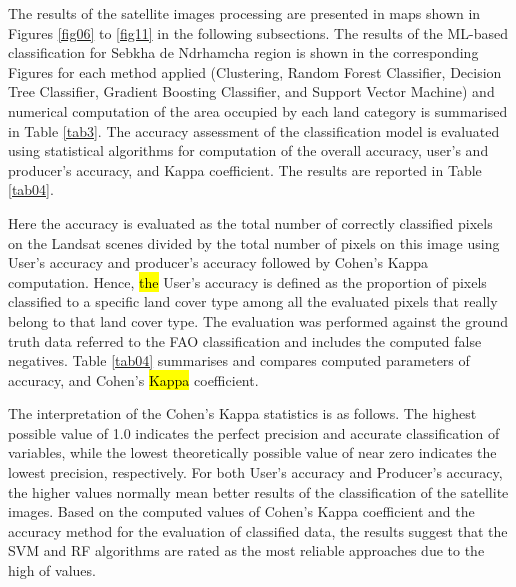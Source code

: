 \documentclass[12pt,a4paper,oneside]{article}
\def \newpar{\vspace{6pt}}
\begin{document}
\newpar The results of the satellite images processing are presented in maps shown in Figures \ref{fig06} to \ref{fig11} in the following subsections. The results of the ML-based classification for Sebkha de Ndrhamcha region  is shown in the corresponding Figures for each method applied (Clustering, Random Forest Classifier, Decision Tree Classifier, Gradient Boosting Classifier, and Support Vector Machine) and numerical computation of the area occupied by each land category is summarised in Table \ref{tab3}. The accuracy assessment of the classification model is evaluated using statistical algorithms for computation of the overall accuracy, user's and producer's accuracy, and Kappa coefficient. The results are reported in Table \ref{tab04}.

\newpar Here the accuracy is evaluated as the total number of correctly classified pixels on the Landsat scenes divided by the total number of pixels on this image using User's accuracy and producer's accuracy followed by Cohen's Kappa computation. Hence, \hl{the} User's accuracy is defined as the proportion of pixels classified to a specific land cover type among all the evaluated pixels that really belong to that land cover type. The evaluation was performed against the ground truth data referred to the FAO classification and includes the computed false negatives. Table \ref{tab04} summarises and compares computed parameters of accuracy, and Cohen's \hl{Kappa} coefficient.

\newpar The interpretation of the Cohen's Kappa statistics is as follows. The highest possible value of 1.0 indicates the perfect precision and accurate classification of variables, while the lowest theoretically possible value of near zero indicates the lowest precision, respectively. For both User's accuracy and Producer's accuracy, the higher values normally mean better results of the classification of the satellite images. Based on the computed values of Cohen's Kappa coefficient and the accuracy method for the evaluation of classified data, the results suggest that the SVM and RF algorithms are rated as the most reliable approaches due to the high of values.
\end{document}
